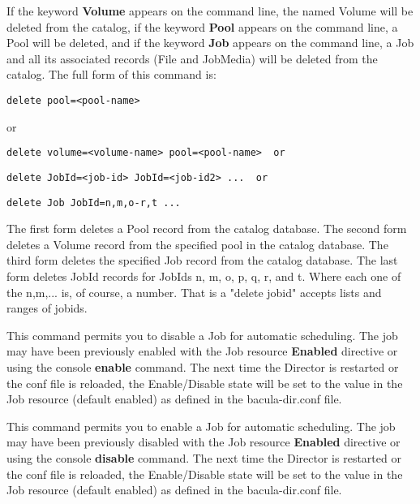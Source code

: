 \begin{description}
   If the keyword {\bf Volume} appears on the command line, the named
   Volume will be deleted from the catalog, if the keyword {\bf Pool}
   appears on the command line, a Pool will be deleted, and if the keyword
   {\bf Job} appears on the command line, a Job and all its associated
   records (File and JobMedia) will be deleted from the catalog.  The full
   form of this command is:

\begin{verbatim}
delete pool=<pool-name>
\end{verbatim}

   or  

\begin{verbatim}
delete volume=<volume-name> pool=<pool-name>  or  
\end{verbatim}

\begin{verbatim}
delete JobId=<job-id> JobId=<job-id2> ...  or  
\end{verbatim}

\begin{verbatim}
delete Job JobId=n,m,o-r,t ...  
\end{verbatim}

   The first form deletes a Pool record from the catalog database.  The
   second form deletes a Volume record from the specified pool in the
   catalog database.  The third form deletes the specified Job record from
   the catalog database.  The last form deletes JobId records for JobIds
   n, m, o, p, q, r, and t.  Where each one of the n,m,...  is, of course, a
   number. That is a "delete jobid" accepts lists and ranges of
   jobids.

\item [disable job\lt{}job-name\gt{}]
  This command permits you to disable a Job for automatic scheduling. 
  The job may have been previously enabled with the Job resource      
  {\bf Enabled} directive or using the console {\bf enable} command.
  The next time the Director is restarted or the conf file is reloaded,
  the Enable/Disable state will be set to the value in the Job resource
  (default enabled) as defined in the bacula-dir.conf file.

\item [enable job\lt{}job-name\gt{}]
  This command permits you to enable a Job for automatic scheduling. 
  The job may have been previously disabled with the Job resource      
  {\bf Enabled} directive or using the console {\bf disable} command.
  The next time the Director is restarted or the conf file is reloaded,
  the Enable/Disable state will be set to the value in the Job resource
  (default enabled) as defined in the bacula-dir.conf file.


\end{description}
